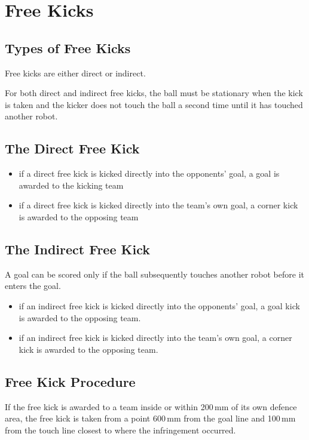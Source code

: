 \section{Free Kicks}\label{sec:free-kicks}

\subsection{Types of Free Kicks}
Free kicks are either direct or indirect.

For both direct and indirect free kicks, the ball must be stationary when the kick is taken and the kicker does not touch the ball a second time  until it has touched another robot.

\subsection{The Direct Free Kick}
\begin{itemize}
\item if a direct free kick is kicked directly into the opponents' goal, a goal is awarded to the
kicking team
\item if a direct free kick is kicked directly into the team's own goal, a corner kick is awarded
to the
opposing team
\end{itemize}

\subsection{The Indirect Free Kick}
A goal can be scored only if the ball subsequently touches another robot before it enters the goal.

\begin{itemize}
\item if an indirect free kick is kicked directly into the opponents' goal, a goal kick is awarded
to the opposing team.
\item if an indirect free kick is kicked directly into the team's own goal, a corner kick is
awarded to the opposing team.
\end{itemize}

\subsection{Free Kick Procedure}
If the free kick is awarded to a team inside or within 200\,mm of its own defence area, the free kick is taken from a point 600\,mm from the goal line and 100\,mm from the touch line closest to where the infringement occurred.

